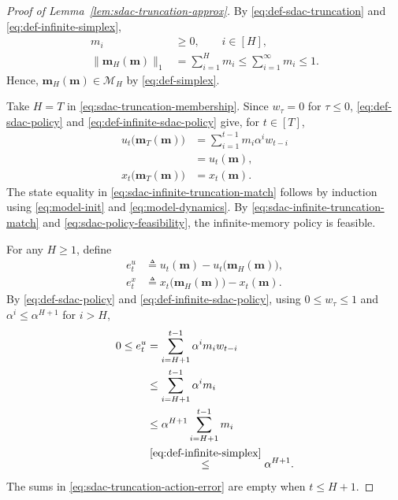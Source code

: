 \documentclass[journal]{IEEEtran}
\theoremstyle{remark}
\begin{document}
\begin{proof}[Proof of Lemma~\ref{lem:sdac-truncation-approx}]
By \eqref{eq:def-sdac-truncation} and \eqref{eq:def-infinite-simplex},
\begin{equation}
\label{eq:sdac-truncation-membership}
\begin{aligned}
m_i&\ge0,\qquad i\in[H],\\
\|\mathbf{m}_H(\mathbf{m})\|_1
&=\sum_{i=1}^H m_i\le\sum_{i=1}^{\infty}m_i\le1.
\end{aligned}
\end{equation}
Hence, $\mathbf{m}_H(\mathbf{m})\in\mathcal{M}_H$ by
\eqref{eq:def-simplex}.

Take $H=T$ in \eqref{eq:sdac-truncation-membership}. Since $w_\tau=0$
for $\tau\le0$, \eqref{eq:def-sdac-policy} and
\eqref{eq:def-infinite-sdac-policy} give, for $t\in[T]$,
\begin{equation}
\label{eq:sdac-infinite-truncation-match}
\begin{aligned}
u_t\bigl(\mathbf{m}_T(\mathbf{m})\bigr)
&=\sum_{i=1}^{t-1}m_i\alpha^i w_{t-i}\\
&=u_t(\mathbf{m}),\\
x_t\bigl(\mathbf{m}_T(\mathbf{m})\bigr)&=x_t(\mathbf{m}).
\end{aligned}
\end{equation}
The state equality in \eqref{eq:sdac-infinite-truncation-match} follows by
induction using \eqref{eq:model-init} and \eqref{eq:model-dynamics}.
By \eqref{eq:sdac-infinite-truncation-match} and
\eqref{eq:sdac-policy-feasibility}, the infinite-memory policy is feasible.

For any $H\ge1$, define
\begin{equation}
\label{eq:sdac-truncation-errors}
\begin{aligned}
e_t^u&\triangleq
u_t(\mathbf{m})-u_t\bigl(\mathbf{m}_H(\mathbf{m})\bigr),\\
e_t^x&\triangleq
x_t\bigl(\mathbf{m}_H(\mathbf{m})\bigr)-x_t(\mathbf{m}).
\end{aligned}
\end{equation}
By \eqref{eq:def-sdac-policy} and \eqref{eq:def-infinite-sdac-policy},
using $0\le w_\tau\le1$ and $\alpha^i\le\alpha^{H+1}$ for $i>H$,
\begin{equation}
\label{eq:sdac-truncation-action-error}
\begin{aligned}
0\le e_t^u
&=\sum_{i=H+1}^{t-1}\alpha^i m_i w_{t-i}\\
&\le\sum_{i=H+1}^{t-1}\alpha^i m_i\\
&\le\alpha^{H+1}\sum_{i=H+1}^{t-1}m_i\\
&\overset{\eqref{eq:def-infinite-simplex}}{\le}\alpha^{H+1}.
\end{aligned}
\end{equation}
The sums in \eqref{eq:sdac-truncation-action-error} are empty when $t\le H+1$.


\end{proof}
\end{document}
